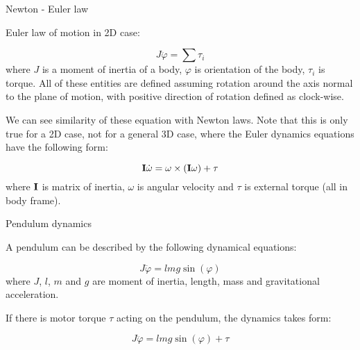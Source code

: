 \documentclass{beamer}
\begin{document}
\begin{frame}{Newton - Euler law}
	\begin{flushleft}
		
		Euler law of motion in 2D case:
		
		\begin{equation}
			J \ddot \varphi = \sum \tau_i
		\end{equation}
		where $J$ is a moment of inertia of a body, $\varphi$ is orientation of the body, $\tau_i$ is torque. All of these entities are defined assuming rotation around the axis normal to the plane of motion, with positive direction of rotation defined as clock-wise.
		
		\bigskip
		
		We can see similarity of these equation with Newton laws. Note that this is only true for a 2D case, not for a general 3D case, where the Euler dynamics equations have the following form:
		
		\begin{equation}
			\mathbf{I} \dot{\omega} = \omega \times (\mathbf{I} \omega) + \tau
		\end{equation}
	where $\mathbf{I}$ is matrix of inertia, $\omega$ is angular velocity and $\tau$ is external torque (all in body frame).
		
	\end{flushleft}
\end{frame}




\begin{frame}{Pendulum dynamics}
	\begin{flushleft}
		
		A pendulum can be described by the following dynamical equations:
		
		\begin{equation}
			J \ddot \varphi = lmg \sin (\varphi)
		\end{equation}		
		where $J$, $l$, $m$ and $g$ are moment of inertia, length, mass and gravitational acceleration. 
		
		\bigskip
		
		If there is motor torque $\tau$ acting on the pendulum, the dynamics takes form:
		
		\begin{equation}
			J \ddot \varphi = lmg \sin (\varphi) + \tau
		\end{equation}		
		
		
	\end{flushleft}
\end{frame}
\end{document}
